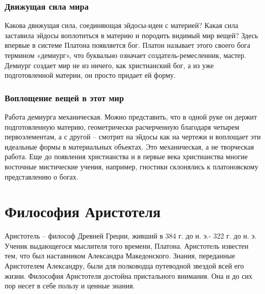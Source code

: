 \documentclass[
]{article}
\begin{document}
\hypertarget{ux434ux432ux438ux436ux443ux449ux430ux44f-ux441ux438ux43bux430-ux43cux438ux440ux430}{%
\subsubsection{Движущая сила
мира}\label{ux434ux432ux438ux436ux443ux449ux430ux44f-ux441ux438ux43bux430-ux43cux438ux440ux430}}

Какова движущая сила, соединяющая эйдосы-идеи с материей? Какая сила
заставила эйдосы воплотиться в материю и породить видимый мир вещей?
Здесь впервые в системе Платона появляется бог. Платон называет этого
своего бога термином «демиург», что буквально означает
создатель-ремесленник, мастер. Демиург создает мир не из ничего, как
христианский бог, а из уже подготовленной материи, он просто придает ей
форму.

\hypertarget{ux432ux43eux43fux43bux43eux449ux435ux43dux438ux435-ux432ux435ux449ux435ux439-ux432-ux44dux442ux43eux442-ux43cux438ux440}{%
\subsubsection{Воплощение вещей в этот
мир}\label{ux432ux43eux43fux43bux43eux449ux435ux43dux438ux435-ux432ux435ux449ux435ux439-ux432-ux44dux442ux43eux442-ux43cux438ux440}}

Работа демиурга механическая. Можно представить, что в одной руке он
держит подготовленную материю, геометрически расчерченную благодаря
четырем первоэлементам, а с другой -- смотрит на эйдосы как на чертежи и
воплощает эти идеальные формы в материальных объектах. Это механическая,
а не творческая работа. Еще до появления христианства и в первые века
христианства многие восточные мистические учения, например, гностики
склонялись к платоновскому представлению о богах.

\hypertarget{ux444ux438ux43bux43eux441ux43eux444ux438ux44f-ux430ux440ux438ux441ux442ux43eux442ux435ux43bux44f}{%
\section{Философия
Аристотеля}\label{ux444ux438ux43bux43eux441ux43eux444ux438ux44f-ux430ux440ux438ux441ux442ux43eux442ux435ux43bux44f}}

Аристотель -- философ Древней Греции, живший в 384 г. до н. э.- 322 г.
до н. э. Ученик выдающегося мыслителя того времени, Платона. Аристотель
известен тем, что был наставником Александра Македонского. Знания,
переданные Аристотелем Александру, были для полководца путеводной
звездой всей его жизни. Философия Аристотеля достойна пристального
внимания. Она и до сих пор несет в себе пользу и ценные знания.
\end{document}
